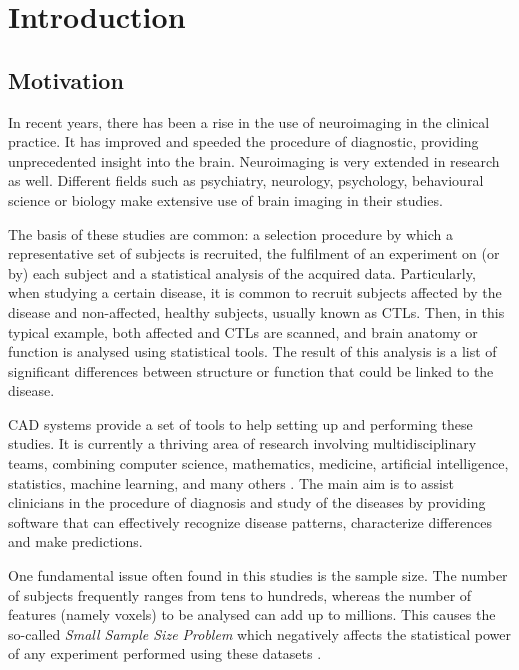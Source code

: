 \chapter{Introduction}\label{ch:introduction}
\section{Motivation}
In recent years, there has been a rise in the use of neuroimaging in the clinical practice. It has improved and speeded the procedure of diagnostic, providing unprecedented insight into the brain. Neuroimaging is very extended in research as well. Different fields such as psychiatry, neurology, psychology, behavioural science or biology make extensive use of brain imaging in their studies. 

The basis of these studies are common: a selection procedure by which a representative set of subjects is recruited, the fulfilment of an experiment on (or by) each subject and a statistical analysis of the acquired data. Particularly, when studying a certain disease, it is common to recruit subjects affected by the disease and non-affected, healthy subjects, usually known as \acp{CTL}. Then, in this typical example, both affected and \acp{CTL} are scanned, and brain anatomy or function is analysed using statistical tools. The result of this analysis is a list of significant differences between structure or function that could be linked to the disease. 

\ac{CAD} systems provide a set of tools to help setting up and performing these studies. It is currently a thriving area of research involving multidisciplinary teams, combining computer science, mathematics, medicine, artificial intelligence, statistics, machine learning, and many others \cite{Martinez-Murcia2016}. The main aim is to assist clinicians in the procedure of diagnosis and study of the diseases by providing software that can effectively recognize disease patterns, characterize differences and make predictions. 

One fundamental issue often found in this studies is the sample size. The number of subjects frequently ranges from tens to hundreds, whereas the number of features (namely voxels) to be analysed can add up to millions. This causes the so-called \emph{Small Sample Size Problem} \cite{Duin2000} which negatively affects the statistical power of any experiment performed using these datasets \cite{Button2013}. 

